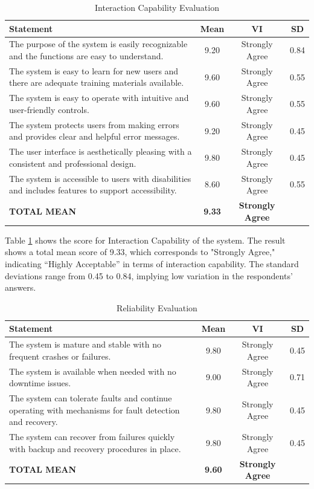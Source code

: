 	
	\begin{table}[h!]
		\centering
		\caption{Interaction Capability Evaluation}
		\label{intcap}
		\renewcommand{\arraystretch}{1.2}
		\begin{tabularx}{\linewidth}{|X|c|c|c|}
			\hline
			\textbf{Statement} & \textbf{Mean} & \textbf{VI} & \textbf{SD} \\ \hline
			The purpose of the system is easily recognizable and the functions are easy to understand.
			& 9.20 & Strongly Agree & 0.84 \\ \hline
			The system is easy to learn for new users and there are adequate training materials available.
			& 9.60 & Strongly Agree & 0.55 \\ \hline
			The system is easy to operate with intuitive and user-friendly controls.
			& 9.60 & Strongly Agree & 0.55 \\ \hline
			The system protects users from making errors and provides clear and helpful error messages.
			& 9.20 & Strongly Agree & 0.45 \\ \hline
			The user interface is aesthetically pleasing with a consistent and professional design.
			& 9.80 & Strongly Agree & 0.45 \\ \hline
			The system is accessible to users with disabilities and includes features to support accessibility.
			& 8.60 & Strongly Agree & 0.55 \\ \hline
			\textbf{TOTAL MEAN} & \textbf{9.33} & \textbf{Strongly Agree} & \\ \hline
		\end{tabularx}
	\end{table}
	
	Table \ref{intcap} shows the score for Interaction Capability of the system. The result shows a total mean score of 9.33, which corresponds to "Strongly Agree," indicating “Highly Acceptable” in terms of interaction capability. The standard deviations range from 0.45 to 0.84, implying low variation in the respondents’ answers.
	
	\begin{table}[h!]
		\centering
		\caption{Reliability Evaluation}
		\label{relblty}
		\renewcommand{\arraystretch}{1.2}
		\begin{tabularx}{\linewidth}{|X|c|c|c|}
			\hline
			\textbf{Statement} & \textbf{Mean} & \textbf{VI} & \textbf{SD} \\ \hline
			The system is mature and stable with no frequent crashes or failures.
			& 9.80 & Strongly Agree & 0.45 \\ \hline
			The system is available when needed with no downtime issues.
			& 9.00 & Strongly Agree & 0.71 \\ \hline
			The system can tolerate faults and continue operating with mechanisms for fault detection and recovery.
			& 9.80 & Strongly Agree & 0.45 \\ \hline
			The system can recover from failures quickly with backup and recovery procedures in place.
			& 9.80 & Strongly Agree & 0.45\\ \hline
			\textbf{TOTAL MEAN} & \textbf{9.60} & \textbf{Strongly Agree} & \\ \hline
		\end{tabularx}
	\end{table}
	
